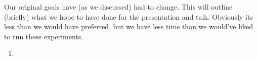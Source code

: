 

Our original goals have (as we discussed) had to change. This will outline (briefly) what we hope to have done for the presentation and talk.
Obviously its less than we would have preferred, but we have less time than we would've liked to run these experiments.

\begin{enumerate}
\item {}
\end{enumerate}
